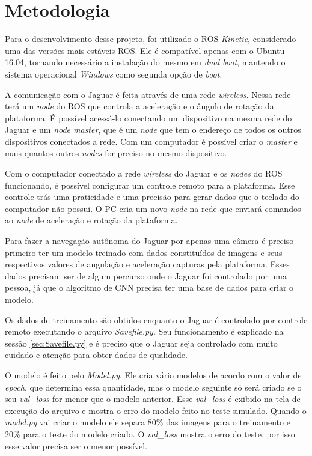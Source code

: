 \chapter{Metodologia}
\label{chap:metodologia}

Para o desenvolvimento desse projeto, foi utilizado o ROS \textit{Kinetic}, considerado uma das versões mais estáveis ROS. Ele é compatível apenas com o Ubuntu 16.04, tornando necessário a instalação do mesmo em \textit{dual boot}, mantendo o sistema operacional \textit{Windows} como segunda opção de \textit{boot}.

A comunicação com o Jaguar é feita através de uma rede \textit{wireless}. Nessa rede terá um \textit{node} do ROS que controla a aceleração e o ângulo de rotação da plataforma. É possível acessá-lo conectando um dispositivo na mesma rede do Jaguar e um \textit{node master}, que é um \textit{node} que tem o endereço de todos os outros dispositivos conectados a rede. Com um computador é possível criar o \textit{master} e mais quantos outros \textit{nodes} for preciso no mesmo dispositivo.

Com o computador conectado a rede \textit{wireless} do Jaguar e os \textit{nodes} do ROS funcionando, é possível configurar um controle remoto para a plataforma. Esse controle trás uma praticidade e uma precisão para gerar dados que o teclado do computador não possui. O PC cria um novo \textit{node} na rede que enviará comandos ao \textit{node} de aceleração e rotação da plataforma. 

Para fazer a navegação autônoma do Jaguar por apenas uma câmera é preciso primeiro ter um modelo treinado com dados constituídos de imagens e seus respectivos valores de angulação e aceleração capturas pela plataforma. Esses dados precisam ser de algum percurso onde o Jaguar foi controlado por uma pessoa, já que o algoritmo de CNN precisa ter uma base de dados para criar o modelo.

Os dados de treinamento são obtidos enquanto o Jaguar é controlado por controle remoto executando o arquivo \textit{Savefile.py}. Seu funcionamento é explicado na sessão \ref{sec:Savefile.py} e é preciso que o Jaguar seja controlado com muito cuidado e atenção para obter dados de qualidade.

O modelo é feito pelo \textit{Model.py}. Ele cria vário modelos de acordo com o valor de \textit{epoch}, que determina essa quantidade, mas o modelo seguinte só será criado se o seu \textit{val\_loss} for menor que o modelo anterior. Esse \textit{val\_loss} é exibido na tela de execução do arquivo e mostra o erro do modelo feito no teste simulado. Quando o \textit{model.py} vai criar o modelo ele separa 80\% das imagens para o treinamento e 20\% para o teste do modelo criado. O \textit{val\_loss} mostra o erro do teste, por isso esse valor precisa ser o menor possível.

